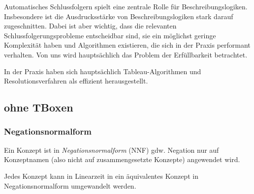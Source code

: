 Automatisches Schlussfolgern spielt eine zentrale Rolle für
Beschreibungslogiken. Insbesondere ist die Ausdrucksstärke von
Beschreibungslogiken stark darauf zugeschnitten.
Dabei ist aber wichtig, dass die relevanten Schlussfolgerungsprobleme
entscheidbar sind, sie ein möglichst geringe Komplexität haben und
Algorithmen existieren, die sich in der Praxis performant verhalten.
Von uns wird hauptsächlich das Problem der Erfüllbarkeit betrachtet.

In der Praxis haben sich hauptsächlich Tableau-Algorithmen und
Resolutionsverfahren als effizient herausgestellt.

\subsection{\texorpdfstring{\ALC}{ALC} ohne TBoxen}\label{alc-ohne-tboxen}

\subsubsection{Negationsnormalform}\label{negationsnormalform}

\begin{definition}[Negationsnormalform]
Ein Konzept ist in \emph{Negationsnormalform} (NNF) gdw. Negation nur auf
Konzeptnamen (also nicht auf zusammengesetzte Konzepte) angewendet wird.
\end{definition}

\begin{lemma}
Jedes Konzept kann in Linearzeit in ein äquivalentes Konzept in
Negationsnormalform umgewandelt werden.
\end{lemma}

